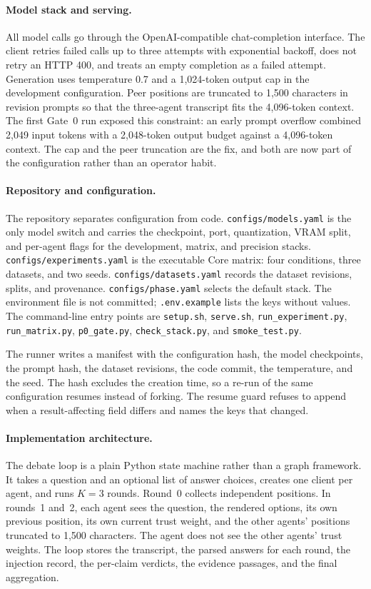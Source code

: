 \paragraph*{Model stack and serving.}
All model calls go through the OpenAI-compatible chat-completion interface. The client retries failed calls up to three attempts with exponential backoff, does not retry an HTTP 400, and treats an empty completion as a failed attempt. Generation uses temperature 0.7 and a 1{,}024-token output cap in the development configuration. Peer positions are truncated to 1{,}500 characters in revision prompts so that the three-agent transcript fits the 4{,}096-token context. The first Gate~0 run exposed this constraint: an early prompt overflow combined 2{,}049 input tokens with a 2{,}048-token output budget against a 4{,}096-token context. The cap and the peer truncation are the fix, and both are now part of the configuration rather than an operator habit.

\paragraph*{Repository and configuration.}
The repository separates configuration from code. \texttt{configs/models.yaml} is the only model switch and carries the checkpoint, port, quantization, VRAM split, and per-agent flags for the development, matrix, and precision stacks. \texttt{configs/experiments.yaml} is the executable Core matrix: four conditions, three datasets, and two seeds. \texttt{configs/datasets.yaml} records the dataset revisions, splits, and provenance. \texttt{configs/phase.yaml} selects the default stack. The environment file is not committed; \texttt{.env.example} lists the keys without values. The command-line entry points are \texttt{setup.sh}, \texttt{serve.sh}, \texttt{run\_experiment.py}, \texttt{run\_matrix.py}, \texttt{p0\_gate.py}, \texttt{check\_stack.py}, and \texttt{smoke\_test.py}.

The runner writes a manifest with the configuration hash, the model checkpoints, the prompt hash, the dataset revisions, the code commit, the temperature, and the seed. The hash excludes the creation time, so a re-run of the same configuration resumes instead of forking. The resume guard refuses to append when a result-affecting field differs and names the keys that changed.

\paragraph*{Implementation architecture.}
The debate loop is a plain Python state machine rather than a graph framework. It takes a question and an optional list of answer choices, creates one client per agent, and runs $K=3$ rounds. Round~0 collects independent positions. In rounds~1 and~2, each agent sees the question, the rendered options, its own previous position, its own current trust weight, and the other agents' positions truncated to 1{,}500 characters. The agent does not see the other agents' trust weights. The loop stores the transcript, the parsed answers for each round, the injection record, the per-claim verdicts, the evidence passages, and the final aggregation.

